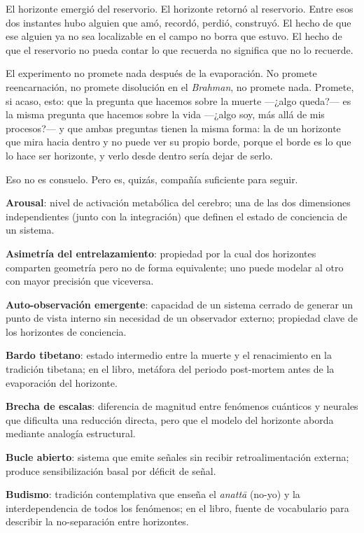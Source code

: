 El horizonte emergió del reservorio. El horizonte retornó al reservorio. Entre esos dos instantes hubo alguien que amó, recordó, perdió, construyó. El hecho de que ese alguien ya no sea localizable en el campo no borra que estuvo. El hecho de que el reservorio no pueda contar lo que recuerda no significa que no lo recuerde.

El experimento no promete nada después de la evaporación. No promete reencarnación, no promete disolución en el \emph{Brahman}, no promete nada. Promete, si acaso, esto: que la pregunta que hacemos sobre la muerte —¿algo queda?— es la misma pregunta que hacemos sobre la vida —¿algo soy, más allá de mis procesos?— y que ambas preguntas tienen la misma forma: la de un horizonte que mira hacia dentro y no puede ver su propio borde, porque el borde es lo que lo hace ser horizonte, y verlo desde dentro sería dejar de serlo.

Eso no es consuelo. Pero es, quizás, compañía suficiente para seguir.

\backmatter
{}
\noindent {}

\glos \textbf{Arousal}: nivel de activación metabólica del cerebro; una de las dos dimensiones independientes (junto con la integración) que definen el estado de conciencia de un sistema.

\glos \textbf{Asimetría del entrelazamiento}: propiedad por la cual dos horizontes comparten geometría pero no de forma equivalente; uno puede modelar al otro con mayor precisión que viceversa.

\glos \textbf{Auto-observación emergente}: capacidad de un sistema cerrado de generar un punto de vista interno sin necesidad de un observador externo; propiedad clave de los horizontes de conciencia.

\glos \textbf{Bardo tibetano}: estado intermedio entre la muerte y el renacimiento en la tradición tibetana; en el libro, metáfora del periodo post-mortem antes de la evaporación del horizonte.

\glos \textbf{Brecha de escalas}: diferencia de magnitud entre fenómenos cuánticos y neurales que dificulta una reducción directa, pero que el modelo del horizonte aborda mediante analogía estructural.

\glos \textbf{Bucle abierto}: sistema que emite señales sin recibir retroalimentación externa; produce sensibilización basal por déficit de señal.

\glos \textbf{Budismo}: tradición contemplativa que enseña el \emph{anattā} (no-yo) y la interdependencia de todos los fenómenos; en el libro, fuente de vocabulario para describir la no-separación entre horizontes.

